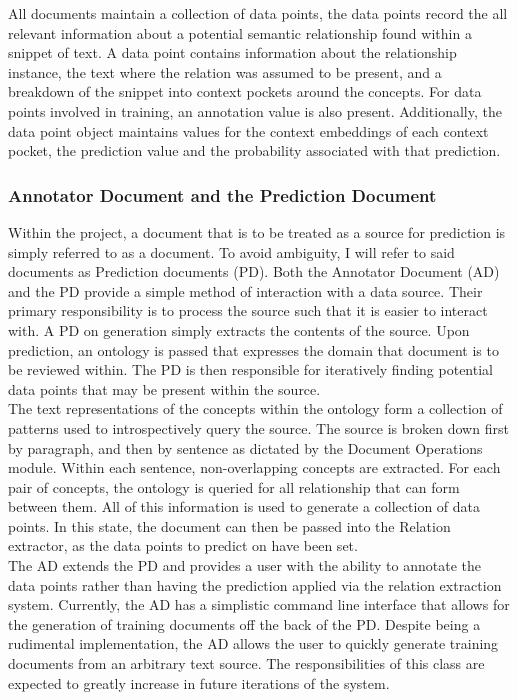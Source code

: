 \documentclass[12pt]{article} %
\begin{document}
All documents maintain a collection of data points, the data points record the all relevant information about a potential semantic relationship found within a snippet of text. A data point contains information about the relationship instance, the text where the relation was assumed to be present, and a breakdown of the snippet into context pockets around the concepts. For data points involved in training, an annotation value is also present. Additionally, the data point object maintains values for the context embeddings of each context pocket, the prediction value and the probability associated with that prediction.

\subsubsection{Annotator Document and the Prediction Document}

Within the project, a document that is to be treated as a source for prediction is simply referred to as a document. To avoid ambiguity, I will refer to said documents as Prediction documents (PD). Both the Annotator Document (AD) and the PD provide a simple method of interaction with a data source. Their primary responsibility is to process the source such that it is easier to interact with. A PD on generation simply extracts the contents of the source. Upon prediction, an ontology is passed that expresses the domain that document is to be reviewed within. The PD is then responsible for iteratively finding potential data points that may be present within the source.\\

The text representations of the concepts within the ontology form a collection of patterns used to introspectively query the source. The source is broken down first by paragraph, and then by sentence as dictated by the Document Operations module. Within each sentence, non-overlapping concepts are extracted. For each pair of concepts, the ontology is queried for all relationship that can form between them. All of this information is used to generate a collection of data points. In this state, the document can then be passed into the Relation extractor, as the data points to predict on have been set.\\

The AD extends the PD and provides a user with the ability to annotate the data points rather than having the prediction applied via the relation extraction system. Currently, the AD has a simplistic command line interface that allows for the generation of training documents off the back of the PD. Despite being a rudimental implementation, the AD allows the user to quickly generate training documents from an arbitrary text source. The responsibilities of this class are expected to greatly increase in future iterations of the system.
\end{document}

